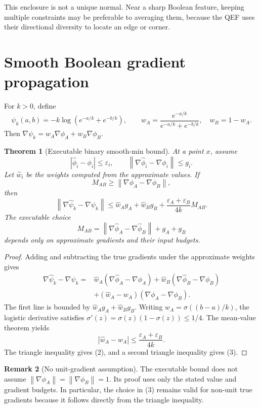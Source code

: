 \documentclass[11pt]{article}
\newtheorem{theorem}{Theorem}
\theoremstyle{definition}
\newtheorem{remark}[theorem]{Remark}
\newcommand{\norm}[1]{\left\lVert#1\right\rVert}
\begin{document}
This enclosure is not a unique normal.  Near a sharp Boolean feature, keeping
multiple constraints may be preferable to averaging them, because the QEF uses
their directional diversity to locate an edge or corner.

\section{Smooth Boolean gradient propagation}

For \(k>0\), define
\[
\psi_k(a,b)=-k\log(e^{-a/k}+e^{-b/k}),
\qquad
w_A=\frac{e^{-a/k}}{e^{-a/k}+e^{-b/k}},
\quad w_B=1-w_A.
\]
Then \(\nabla\psi_k=w_A\nabla\phi_A+w_B\nabla\phi_B\).

\begin{theorem}[Executable binary smooth-min bound]
\label{thm:smooth}
At a point \(x\), assume
\[
|\widehat\phi_i-\phi_i|\le\varepsilon_i,
\qquad
\norm{\nabla\widehat\phi_i-\nabla\phi_i}\le g_i.
\]
Let \(\widehat w_i\) be the weights computed from the approximate values.  If
\[
M_{AB}\ge\norm{\nabla\phi_A-\nabla\phi_B},
\]
then
\[
\norm{\nabla\widehat\psi_k-\nabla\psi_k}
\le
\widehat w_Ag_A+\widehat w_Bg_B
+\frac{\varepsilon_A+\varepsilon_B}{4k}M_{AB}. \tag{2}
\]
The executable choice
\[
M_{AB}=\norm{\nabla\widehat\phi_A-\nabla\widehat\phi_B}+g_A+g_B \tag{3}
\]
depends only on approximate gradients and their input budgets.
\end{theorem}

\begin{proof}
Adding and subtracting the true gradients under the approximate weights gives
\[
\begin{aligned}
\nabla\widehat\psi_k-\nabla\psi_k
={}&\widehat w_A(\nabla\widehat\phi_A-\nabla\phi_A)
+\widehat w_B(\nabla\widehat\phi_B-\nabla\phi_B)\\
&+(\widehat w_A-w_A)(\nabla\phi_A-\nabla\phi_B).
\end{aligned}
\]
The first line is bounded by
\(
\widehat w_Ag_A+\widehat w_Bg_B
\).  Writing \(w_A=\sigma((b-a)/k)\), the logistic derivative satisfies
\(
\sigma'(z)=\sigma(z)(1-\sigma(z))\le1/4
\).  The mean-value theorem yields
\[
|\widehat w_A-w_A|
\le\frac{\varepsilon_A+\varepsilon_B}{4k}.
\]
The triangle inequality gives (2), and a second triangle inequality gives
(3).
\end{proof}

\begin{remark}[No unit-gradient assumption]
\label{rem:no-eikonal}
The executable bound does not assume
\(\norm{\nabla\phi_A}=\norm{\nabla\phi_B}=1\).  Its proof uses only the
stated value and gradient budgets.  In particular, the choice in (3) remains
valid for non-unit true gradients because it follows directly from the
triangle inequality.
\end{remark}
\end{document}
